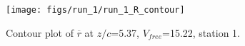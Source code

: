 \begin{figure}[H]
\centering
\texttt{[image: figs/run\_1/run\_1\_R\_contour]}
\caption{Contour plot of $\overline{r}$ at $z/c$=5.37, $V_{free}$=15.22, station 1.}
\label{fig:run_1_R_contour}
\end{figure}


